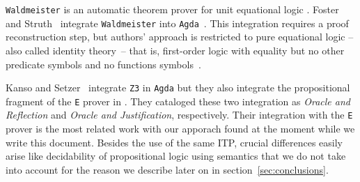 \documentclass[main.tex]{subfiles}
\begin{document}


\verb!Waldmeister! is an automatic theorem prover for unit equational
logic \cite{hillenbrand1997}.
Foster and Struth~\cite{foster2011integrating} integrate \verb!Waldmeister! into
\verb!Agda!~\cite{agdateam}. This integration requires a proof
reconstruction step, but authors' approach is restricted to pure
equational logic --also called identity theory~\cite{humberstone2011}--
that is, first-order logic with equality but no other predicate symbols
and no functions symbols~\cite{appel1959}.

Kanso and Setzer~\cite{kanso2016light} integrate \verb!Z3! in \verb!Agda!
but they also integrate the propositional fragment of the \verb!E! prover in
\cite{Kanso2012}. They cataloged these two integration as
\emph{Oracle and Reflection} and \emph{Oracle and Justification}, respectively.
Their integration with the \verb!E! prover is the most related work with our
apporach found at the moment while we write this document. Besides the use
of the same ITP, crucial differences easily arise like decidability of
propositional logic using semantics that we do not take into account for the
reason we describe later on in section~\ref{sec:conclusions}.
\end{document}

